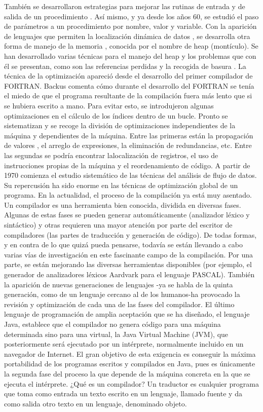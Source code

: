 También se desarrollaron estrategias para mejorar las rutinas de entrada y de salida de un procedimiento . Así mismo, y ya desde los años 60, se estudió el paso de parámetros a un procedimiento por nombre, valor y variable. Con la aparición de lenguajes que permiten la localización dinámica de datos , se desarrolla otra forma de manejo de la memoria , conocida por el nombre de heap (montículo). Se han desarrollado varias técnicas para el manejo del heap y los problemas que con él se presentan, como son las referencias perdidas y la recogida de basura .
La técnica de la optimización apareció desde el desarrollo del primer compilador de FORTRAN. Backus comenta cómo durante el desarrollo del FORTRAN se tenía el miedo de que el programa resultante de la compilación fuera más lento que si se hubiera escrito a mano. Para evitar esto, se introdujeron algunas optimizaciones en el cálculo de los índices dentro de un bucle. Pronto se sistematizan y se recoge la división de optimizaciones independientes de la máquina y dependientes de la máquina. Entre las primeras están la propagación de valores , el arreglo de expresiones, la eliminación de redundancias, etc.
Entre las segundas se podría encontrar lalocalización de registros, el uso de instrucciones propias de la máquina y el reordenamiento de código. A partir de 1970 comienza el estudio sistemático de las técnicas del análisis de flujo de datos. Su repercusión ha sido enorme en las técnicas de optimización global de un programa. En la actualidad, el proceso de la compilación ya está muy asentado. Un compilador es una herramienta bien conocida, dividida en diversas fases. Algunas de estas fases se pueden generar automáticamente (analizador léxico y sintáctico) y otras requieren una mayor atención por parte del escritor de compiladores (las partes de traducción y generación de código).
De todas formas, y en contra de lo que quizá pueda pensarse, todavía se están llevando a cabo varias vías de investigación en este fascinante campo de la compilación. Por una parte, se están mejorando las diversas herramientas disponibles (por ejemplo, el generador de analizadores léxicos Aardvark para el lenguaje PASCAL). También la aparición de nuevas generaciones de lenguajes -ya se habla de la quinta generación, como de un lenguaje cercano al de los humanos-ha provocado la revisión y optimización de cada una de las fases del compilador. El último lenguaje de programación de amplia aceptación que se ha diseñado, el lenguaje Java, establece que el compilador no genera código para una máquina determinada sino para una virtual, la Java Virtual Machine (JVM), que posteriormente será ejecutado por un intérprete, normalmente incluido en un navegador de Internet. El gran objetivo de esta exigencia es conseguir la máxima portabilidad de los programas escritos y compilados en Java, pues es únicamente la segunda fase del proceso la que depende de la máquina concreta en la que se ejecuta el intérprete.
¿Qué es un compilador?
Un traductor es cualquier programa que toma como entrada un texto escrito en un lenguaje, llamado fuente y da como salida otro texto en un lenguaje, denominado objeto.


